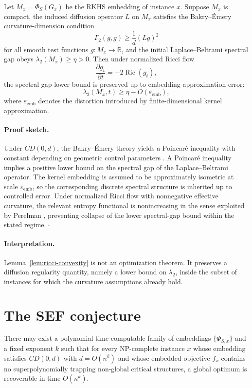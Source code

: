 \documentclass{svjour3}
\begin{document}
\begin{lemma}
\label{lem:ricci-convexity}
Let $M_x=\Phi_S(G_x)$ be the RKHS embedding of instance $x$. Suppose $M_x$ is compact, the induced diffusion operator $L$ on $M_x$ satisfies the Bakry--\'Emery curvature-dimension condition
\[
\Gamma_2(g,g)\ge \frac{1}{d}(Lg)^2
\]
for all smooth test functions $g:M_x\to\mathbb{R}$, and the initial Laplace--Beltrami spectral gap obeys $\lambda_2(M_x)\ge \eta>0$. Then under normalized Ricci flow
\[
\frac{\partial g_t}{\partial t} = -2\operatorname{Ric}(g_t),
\]
the spectral gap lower bound is preserved up to embedding-approximation error:
\[
\lambda_2(M_x,t)\ge \eta - O(\varepsilon_{\mathrm{emb}}),
\]
where $\varepsilon_{\mathrm{emb}}$ denotes the distortion introduced by finite-dimensional kernel approximation.
\end{lemma}

\paragraph{Proof sketch.}
Under $CD(0,d)$, the Bakry--\'Emery theory yields a Poincar\'e inequality with constant depending on geometric control parameters \citep{bakry1985diffusions,ledoux2001concentration}. A Poincar\'e inequality implies a positive lower bound on the spectral gap of the Laplace--Beltrami operator. The kernel embedding is assumed to be approximately isometric at scale $\varepsilon_{\mathrm{emb}}$, so the corresponding discrete spectral structure is inherited up to controlled error. Under normalized Ricci flow with nonnegative effective curvature, the relevant entropy functional is nonincreasing in the sense exploited by Perelman \citep{perelman2002entropy}, preventing collapse of the lower spectral-gap bound within the stated regime. \hfill$\square$

\paragraph{Interpretation.}
Lemma~\ref{lem:ricci-convexity} is not an optimization theorem. It preserves a diffusion regularity quantity, namely a lower bound on $\lambda_2$, inside the subset of instances for which the curvature assumptions already hold.

\section{The SEF conjecture}
\begin{proposition}
There may exist a polynomial-time computable family of embeddings $\{\Phi_{S,x}\}$ and a fixed exponent $k$ such that for every NP-complete instance $x$ whose embedding satisfies $CD(0,d)$ with $d=O(n^k)$ and whose embedded objective $f_x$ contains no superpolynomially trapping non-global critical structures, a global optimum is recoverable in time $O(n^k)$.
\end{proposition}
\end{document}
